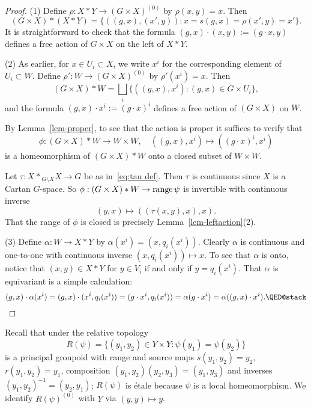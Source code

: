 \documentclass[12pt,a4paper]{amsart}
\newcommand{\fibredprod}[2]{\mathbin{\mbox{${{}_{#1}}{*}{{}_{#2}}$}}}
\begin{document}
\begin{proof}
(1) Define $\rho: X*Y\to (G\times X)^{(0)}$ by $\rho(x,y)=x$.
Then
\[
    (G\times X)*(X*Y) = \{((g,x),(x',y)) : x=s(g,x)=\rho(x',y)=x'\}.
\]
It is straightforward to check that the formula
$(g,x)\cdot(x,y) := (g\cdot x, y)$ defines a free action of $G
\times X$ on the left of $X*Y$.

(2) As earlier, for $x \in U_i \subset X$, we write $x^i$ for
the corresponding element of $U_i \subset W$. Define
$\rho':W\to (G\times X)^{(0)}$ by $\rho'(x^i)=x$. Then
\[\textstyle
(G\times X)* W = \bigsqcup_i \{((g,x),x^i) : (g,x) \in G \times U_i\},
\]
and the formula $(g,x)\cdot x^i := (g\cdot x)^i$ defines a free
action of $(G \times X)$ on $W$.

By Lemma~\ref{lem-proper}, to see that the action is proper it suffices to verify that
\[\textstyle
    \phi:(G\times X)* W\to W \times W,
        \quad ((g,x),x^i)\mapsto((g\cdot x)^i, x^i)
\]
is a homeomorphism of $(G\times X) * W$ onto a closed subset of
$W \times W$.

Let $\tau : X \fibredprod{}{G \setminus X} X \to G$ be as
in~\eqref{eq:tau def}. Then $\tau$ is continuous since $X$ is a
Cartan $G$-space. So $\phi:(G\times X) * W \to \operatorname{range}\psi$ is
invertible with continuous inverse
\[
(y,x)\mapsto ((\tau(x,y),x),x).
\]
That the range of $\phi$ is closed is precisely
Lemma~\ref{lem-leftaction}(2).

(3) Define $\alpha: W \to X*Y$ by $\alpha(x^i)=(x,q_i(x^i))$.
Clearly $\alpha$ is continuous and one-to-one with
continuous inverse $(x, q_i(x^i))\mapsto x$.  To see that
$\alpha$ is onto, notice that $(x,y)\in X*Y$ for $y \in V_i$ if and only if
$y = q_i(x^i)$.
That $\alpha$ is equivariant is a simple calculation:
\[
(g,x)\cdot\alpha(x^i)
    =(g,x)\cdot (x^i, q_i(x^i))
    =(g\cdot x^i,  q_i(x^i))
    =\alpha(g\cdot x^i)
    =\alpha((g,x)\cdot x^i).\qedhere
\]
\end{proof}

Recall that under the relative topology
\[
    R(\psi)=\{(y_1, y_2)\in Y\times Y:\psi(y_1)=\psi(y_2)\}
\]
is a principal  groupoid with range and source maps $s(y_1, y_2)=y_2$,
$r(y_1, y_2)=y_1$, composition $(y_1, y_2)(y_2, y_3) = (y_1,
y_3)$ and inverses $(y_1,y_2)^{-1} = (y_2, y_1)$; $R(\psi)$ is \'etale because $\psi$ is a local homeomorphism.
We identify $R(\psi)^{(0)}$ with $Y$ via $(y,y) \mapsto y$.
\end{document}

